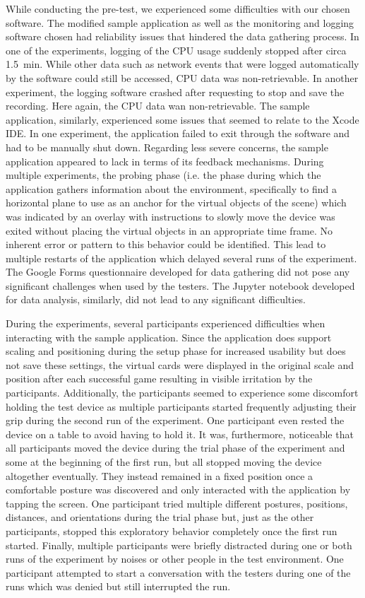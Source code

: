 \documentclass[12pt,twoside,english]{article}
\begin{document}
While conducting the pre-test, we experienced some difficulties with our chosen software.
The modified sample application as well as the monitoring and logging software chosen had reliability issues that hindered the data gathering process.
In one of the experiments, logging of the \gls{CPU} usage suddenly stopped after circa 1.5~min.
While other data such as network events that were logged automatically by the software could still be accessed, \gls{CPU} data was non-retrievable.
In another experiment, the logging software crashed after requesting to stop and save the recording.
Here again, the \gls{CPU} data wan non-retrievable.
The sample application, similarly, experienced some issues that seemed to relate to the Xcode \gls{IDE}.
In one experiment, the application failed to exit through the software and had to be manually shut down.
Regarding less severe concerns, the sample application appeared to lack in terms of its feedback mechanisms.
During multiple experiments, the probing phase (i.e. the phase during which the application gathers information about the environment, specifically to find a horizontal plane to use as an anchor for the virtual objects of the scene) which was indicated by an overlay with instructions to slowly move the device was exited without placing the virtual objects in an appropriate time frame.
No inherent error or pattern to this behavior could be identified.
This lead to multiple restarts of the application which delayed several runs of the experiment.
The Google Forms questionnaire developed for data gathering did not pose any significant challenges when used by the testers.
The Jupyter notebook developed for data analysis, similarly, did not lead to any significant difficulties.

During the experiments, several participants experienced difficulties when interacting with the sample application.
Since the application does support scaling and positioning during the setup phase for increased usability but does not save these settings, the virtual cards were displayed in the original scale and position after each successful game resulting in visible irritation by the participants.
Additionally, the participants seemed to experience some discomfort holding the test device as multiple participants started frequently adjusting their grip during the second run of the experiment.
One participant even rested the device on a table to avoid having to hold it.
It was, furthermore, noticeable that all participants moved the device during the trial phase of the experiment and some at the beginning of the first run, but all stopped moving the device altogether eventually.
They instead remained in a fixed position once a comfortable posture was discovered and only interacted with the application by tapping the screen.
One participant tried multiple different postures, positions, distances, and orientations during the trial phase but, just as the other participants, stopped this exploratory behavior completely once the first run started.
Finally, multiple participants were briefly distracted during one or both runs of the experiment by noises or other people in the test environment.
One participant attempted to start a conversation with the testers during one of the runs which was denied but still interrupted the run.
\end{document}
